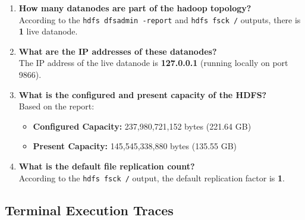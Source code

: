 \documentclass{article}
\begin{document}
\begin{enumerate}
    \item \textbf{How many datanodes are part of the hadoop topology?} \\
    According to the \texttt{hdfs dfsadmin -report} and \texttt{hdfs fsck /} outputs, there is \textbf{1} live datanode.
    
    \item \textbf{What are the IP addresses of these datanodes?} \\
    The IP address of the live datanode is \textbf{127.0.0.1} (running locally on port 9866).
    
    \item \textbf{What is the configured and present capacity of the HDFS?} \\
    Based on the report:
    \begin{itemize}
        \item \textbf{Configured Capacity:} 237,980,721,152 bytes (221.64 GB)
        \item \textbf{Present Capacity:} 145,545,338,880 bytes (135.55 GB)
    \end{itemize}
    
    \item \textbf{What is the default file replication count?} \\
    According to the \texttt{hdfs fsck /} output, the default replication factor is \textbf{1}.
\end{enumerate}

\subsection*{Terminal Execution Traces}
\end{document}
